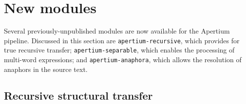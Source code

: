 \documentclass[free]{flammie}
\begin{document}
\section{New modules}\label{sec:NewModules}

Several previously-unpublished modules are now available for the Apertium
pipeline.  Discussed in this section are \texttt{apertium-recursive}, which
provides for true recursive transfer; \texttt{apertium-separable}, which enables
the processing of multi-word expressions; and \texttt{apertium-anaphora}, which
allows the resolution of anaphors in the source text.

\subsection{Recursive structural transfer}\label{sec:RecursiveStruc}
\end{document}
